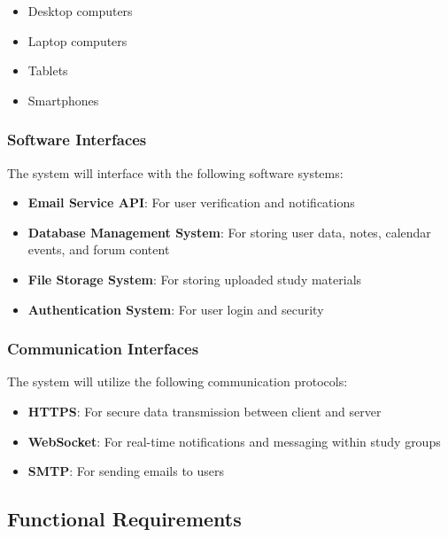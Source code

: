 \documentclass{article}
\begin{document}
\begin{itemize}
    \item Desktop computers
    \item Laptop computers
    \item Tablets
    \item Smartphones
\end{itemize}

\subsubsection{Software Interfaces}
The system will interface with the following software systems:

\begin{itemize}
    \item \textbf{Email Service API}: For user verification and notifications
    \item \textbf{Database Management System}: For storing user data, notes, calendar events, and forum content
    \item \textbf{File Storage System}: For storing uploaded study materials
    \item \textbf{Authentication System}: For user login and security
\end{itemize}

\subsubsection{Communication Interfaces}
The system will utilize the following communication protocols:

\begin{itemize}
    \item \textbf{HTTPS}: For secure data transmission between client and server
    \item \textbf{WebSocket}: For real-time notifications and messaging within study groups
    \item \textbf{SMTP}: For sending emails to users
\end{itemize}

\clearpage
\subsection{Functional Requirements}
\end{document}
